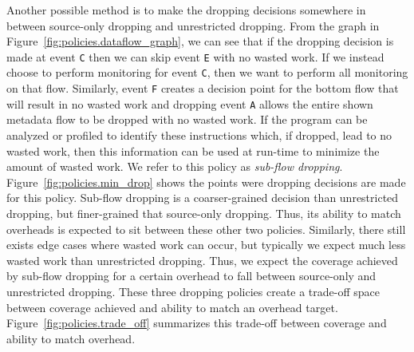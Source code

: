 Another possible method is to make the dropping decisions somewhere in between
source-only dropping and unrestricted dropping. From the graph in 
Figure~\ref{fig:policies.dataflow_graph}, we can see that if the dropping
decision is made at event {\tt C} then we can skip event {\tt E} with no wasted
work. If we instead choose to perform monitoring for event {\tt C}, then we want to perform all
monitoring on that flow. Similarly, event {\tt F} creates a decision point for
the bottom flow that will result in no wasted work and dropping event {\tt A}
allows the entire shown metadata flow to be dropped with no wasted work. If the
program can be
analyzed or profiled to identify these instructions which, if dropped, lead to
no wasted work, then this information can be used at run-time to minimize the
amount of wasted work. We refer to this policy as \emph{sub-flow dropping}.
Figure~\ref{fig:policies.min_drop} shows the points were dropping decisions are
made for this policy.
Sub-flow dropping is a coarser-grained decision than unrestricted dropping, but
finer-grained that source-only dropping. Thus, its ability to match overheads is
expected to sit between these other two policies. Similarly, there still exists
edge cases where wasted work can occur, but typically we expect much less
wasted work than unrestricted 
dropping. Thus, we expect the coverage achieved by sub-flow dropping for a
certain overhead to fall between source-only and unrestricted dropping. These three
dropping policies create a trade-off space between coverage achieved and
ability to match an overhead target.
Figure~\ref{fig:policies.trade_off} summarizes this trade-off between coverage
and ability to match overhead.
